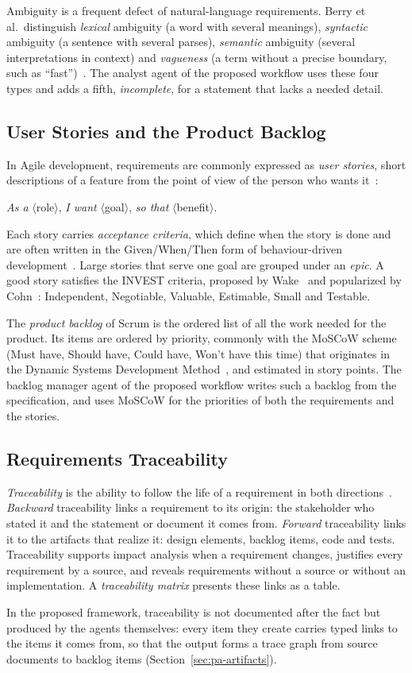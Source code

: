 Ambiguity is a frequent defect of natural-language requirements. Berry et al.\ distinguish \emph{lexical} ambiguity (a word with several meanings), \emph{syntactic} ambiguity (a sentence with several parses), \emph{semantic} ambiguity (several interpretations in context) and \emph{vagueness} (a term without a precise boundary, such as ``fast'')~\cite{berry2003ambiguity}. The analyst agent of the proposed workflow uses these four types and adds a fifth, \emph{incomplete}, for a statement that lacks a needed detail.

\subsection{User Stories and the Product Backlog}
\label{sec:bg-user-stories}

In Agile development, requirements are commonly expressed as \emph{user stories}, short descriptions of a feature from the point of view of the person who wants it~\cite{cohn2004user}:
\begin{center}
    \textit{As a} $\langle$role$\rangle$, \textit{I want} $\langle$goal$\rangle$, \textit{so that} $\langle$benefit$\rangle$.
\end{center}
Each story carries \emph{acceptance criteria}, which define when the story is done and are often written in the Given/When/Then form of behaviour-driven development~\cite{north2006bdd}. Large stories that serve one goal are grouped under an \emph{epic}. A good story satisfies the INVEST criteria, proposed by Wake~\cite{wake2003invest} and popularized by Cohn~\cite{cohn2004user}: Independent, Negotiable, Valuable, Estimable, Small and Testable.

The \emph{product backlog} of Scrum is the ordered list of all the work needed for the product. Its items are ordered by priority, commonly with the MoSCoW scheme (Must have, Should have, Could have, Won't have this time) that originates in the Dynamic Systems Development Method~\cite{clegg1994moscow}, and estimated in story points. The backlog manager agent of the proposed workflow writes such a backlog from the specification, and uses MoSCoW for the priorities of both the requirements and the stories.

\subsection{Requirements Traceability}
\label{sec:bg-traceability}

\emph{Traceability} is the ability to follow the life of a requirement in both directions~\cite{pohl2010requirements}. \emph{Backward} traceability links a requirement to its origin: the stakeholder who stated it and the statement or document it comes from. \emph{Forward} traceability links it to the artifacts that realize it: design elements, backlog items, code and tests. Traceability supports impact analysis when a requirement changes, justifies every requirement by a source, and reveals requirements without a source or without an implementation. A \emph{traceability matrix} presents these links as a table.

In the proposed framework, traceability is not documented after the fact but produced by the agents themselves: every item they create carries typed links to the items it comes from, so that the output forms a trace graph from source documents to backlog items (Section~\ref{sec:pa-artifacts}).
